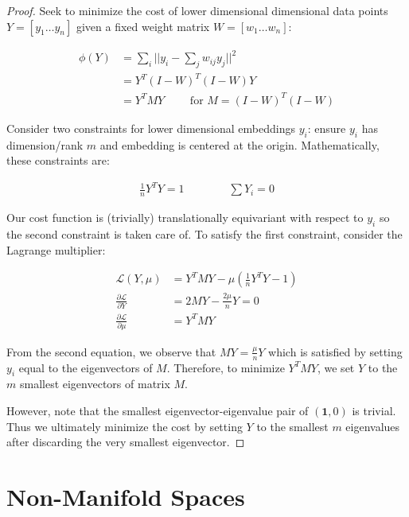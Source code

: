 \documentclass{article}
\begin{document}
        \begin{proof}
            Seek to minimize the cost of lower dimensional dimensional data points $Y = [y_1 \ldots y_n]$ given a fixed weight matrix $W = [w_1 \ldots w_n]$:

            \begin{align*}
                \phi(Y) &= \sum_i ||y_i - \sum_j w_{ij} y_j ||^2 \\
                &= Y^T (I - W)^T (I - W) Y \\
                &= Y^T M Y \qquad \textrm{ for } M = (I - W)^T (I - W)
            \end{align*}

            Consider two constraints for lower dimensional embeddings $y_i$: ensure $y_i$ has dimension/rank $m$ and embedding is centered at the origin. Mathematically, these constraints are:

            \begin{align*}
                \frac{1}{n} Y^T Y = 1 \qquad \qquad \sum Y_i = 0
            \end{align*}

            Our cost function is (trivially) translationally equivariant with respect to $y_i$ so the second constraint is taken care of. To satisfy the first constraint, consider the Lagrange multiplier:

            \begin{align*}
                \mathcal{L}(Y, \mu) &= Y^T M Y - \mu (\frac{1}{n} Y^T Y - 1) \\
                \frac{\partial \mathcal{L}}{\partial Y} &= 2 M Y - \frac{2 \mu}{n} Y = 0 \\
                \frac{\partial \mathcal{L}}{\partial \mu} &= Y^T M Y
            \end{align*}

            From the second equation, we observe that $M Y = \frac{\mu}{n} Y$ which is satisfied by setting $y_i$ equal to the eigenvectors of $M$. Therefore, to minimize $Y^T M Y$, we set $Y$ to the $m$ smallest eigenvectors of matrix $M$.
            
            However, note that the smallest eigenvector-eigenvalue pair of $(\mathbf{1}, 0)$ is trivial. Thus we ultimately minimize the cost by setting $Y$ to the smallest $m$ eigenvalues after discarding the very smallest eigenvector. 
        \end{proof}

\section{Non-Manifold Spaces}
\end{document}
